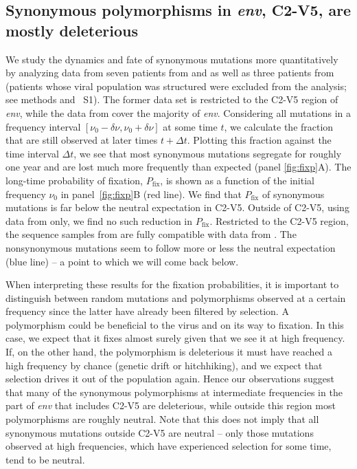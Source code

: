 \documentclass[10pt]{article}
\newcommand{\pfix}{P_{\mathrm{fix}}}
\newcommand{\env}{\textit{env}}
\newcommand{\shankaregion}{C2-V5}
\newcommand{\PCApat}{1}
\begin{document}
\subsection*{Synonymous polymorphisms in \env, \shankaregion, are mostly deleterious}
We study the dynamics and fate of synonymous mutations more quantitatively by
analyzing data from seven patients from 
\cite{shankarappa_consistent_1999} and \cite{liu_selection_2006} as well as three patients from
\cite{bunnik_autologous_2008} (patients whose viral population was structured
were excluded from the analysis; see methods and \figurename~S\PCApat).  The
former data set is restricted to the \shankaregion{} region of \env, while
the data from \cite{bunnik_autologous_2008} cover the majority of \env.
Considering all mutations in a frequency interval $[\nu_0-\delta\nu, \nu_0+\delta\nu]$ at some time
$t$, we calculate the fraction that are still observed at later times $t+\Delta t$. Plotting this fraction against the time interval $\Delta t$, we see that
most synonymous mutations segregate for roughly one year and are lost much more
frequently than expected (panel \ref{fig:fixp}A). The long-time probability of
fixation, $\pfix$, is shown as a function of the
initial frequency $\nu_0$ in panel~\ref{fig:fixp}B (red line). 
We find that $\pfix$ of synonymous mutations is far below
the neutral expectation in  \shankaregion.  Outside of \shankaregion, using data from
\cite{bunnik_autologous_2008} only, we find no such reduction in $\pfix$.
Restricted to the \shankaregion{} region, the sequence samples from
\cite{bunnik_autologous_2008} are fully compatible with data from
\cite{shankarappa_consistent_1999}. The nonsynonymous mutations seem to follow
more or less the neutral expectation (blue line) -- a point to which we will
come back below.

When interpreting these results for the fixation probabilities, it is important
to distinguish between random mutations and polymorphisms observed at a certain
frequency since the latter have already been filtered by selection.
A polymorphism could be beneficial to the virus and on its way to fixation. In
this case, we expect that it fixes almost surely given that we see it at high
frequency. If, on the other hand, the polymorphism is deleterious it must have
reached a high frequency by chance (genetic drift or hitchhiking), and
we expect that selection drives it out of the population again. Hence our
observations suggest that many of the synonymous polymorphisms at intermediate
frequencies in the part of \env{} that includes \shankaregion{} are
deleterious, while outside this region most polymorphisms are roughly
neutral. Note that this does not imply that all synonymous mutations outside 
\shankaregion{} are neutral -- only those mutations observed at high frequencies, which
have experienced selection for some time, tend to be neutral.
\end{document}
